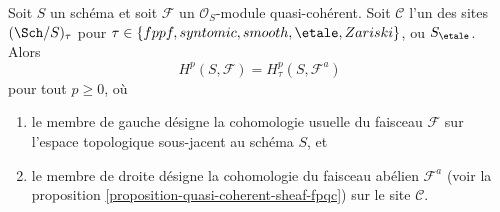 \begin{theorem}
\label{theorem-zariski-fpqc-quasi-coherent}
Soit $S$ un sch\'ema et soit $\mathcal{F}$ un $\mathcal{O}_S$-module quasi-coh\'erent.
Soit $\mathcal{C}$ l'un des sites $(\Sch/S)_\tau$ pour
$\tau \in \{fppf, syntomic, smooth, \etale, Zariski\}$, ou
$S_\etale$. Alors
$$
H^p(S, \mathcal{F}) = H^p_\tau(S, \mathcal{F}^a)
$$
pour tout $p \geq 0$, o\`u
\begin{enumerate}
\item le membre de gauche d\'esigne la cohomologie usuelle du faisceau
$\mathcal{F}$ sur l'espace topologique sous-jacent au sch\'ema $S$, et
\item le membre de droite d\'esigne la cohomologie
du faisceau ab\'elien $\mathcal{F}^a$ (voir
la proposition \ref{proposition-quasi-coherent-sheaf-fpqc})
sur le site $\mathcal{C}$.
\end{enumerate}
\end{theorem}

